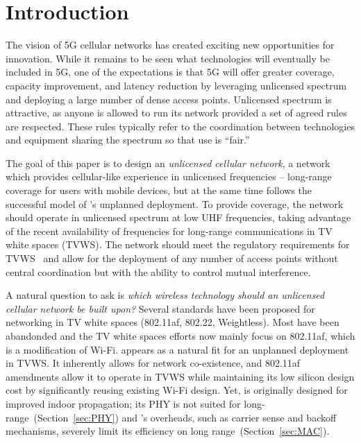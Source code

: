 \section{Introduction}
The vision of 5G cellular networks has created exciting new opportunities for innovation. 
While it remains to be seen what technologies will eventually be included in 5G, 
one of the expectations is that
5G will offer greater coverage, capacity improvement, and latency reduction
by leveraging unlicensed spectrum and deploying a large number of
dense access points. Unlicensed spectrum is attractive, as anyone is
allowed to run its network provided a set of agreed rules are respected.  These
rules typically refer to the coordination between technologies and
equipment sharing the spectrum so that use is ``fair.''

The goal of this paper is to design an {\em unlicensed cellular network}, a network which provides cellular-like experience in unlicensed frequencies -- long-range coverage for users with mobile devices,
but at the same time follows the successful model of \wf's unplanned deployment.
To provide coverage, the network should operate in unlicensed spectrum at low UHF frequencies,
taking advantage of the recent availability of frequencies for long-range communications in TV white spaces (TVWS).
The network should meet the regulatory requirements for TVWS~\cite{etsi_tvws, Rice_af} and allow for the deployment of any number of access points without central coordination but with the ability to control mutual interference.

A natural question to ask is \emph{which wireless technology should an unlicensed cellular network be built upon?}
Several standards have been proposed for networking in TV white spaces (802.11af\cite{Rice_af}, 802.22\cite{802.22}, Weightless\cite{weightless}). Most have been abandonded and the TV white spaces efforts now mainly focus 
on 802.11af, which is a modification of Wi-Fi. 
\wf appears as a natural fit for an unplanned deployment in TVWS.
It inherently allows for network co-existence, and 802.11af amendments allow it to operate in TVWS while maintaining its low silicon design cost by significantly reusing existing Wi-Fi design. 
Yet, \wf is originally designed for improved indoor propagation; its PHY is not suited for long-range~(Section~\ref{sec:PHY}) and 
\wf's overheads, such as carrier sense and backoff mechanisms, severely limit its efficiency on long range~(Section~\ref{sec:MAC}). 



